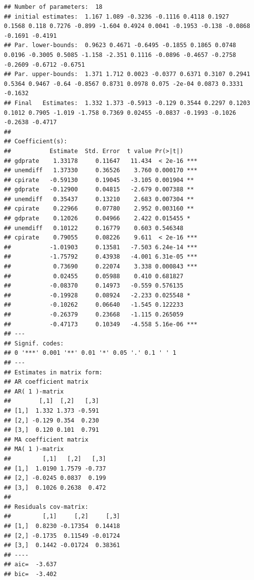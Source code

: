 \documentclass[]{book}
\newenvironment{Shaded}{\begin{snugshade}}{\end{snugshade}}
\newcommand{\DataTypeTok}[1]{\textcolor[rgb]{0.13,0.29,0.53}{#1}}
\newcommand{\DecValTok}[1]{\textcolor[rgb]{0.00,0.00,0.81}{#1}}
\newcommand{\KeywordTok}[1]{\textcolor[rgb]{0.13,0.29,0.53}{\textbf{#1}}}
\newcommand{\NormalTok}[1]{#1}
\newcommand{\OperatorTok}[1]{\textcolor[rgb]{0.81,0.36,0.00}{\textbf{#1}}}
\begin{document}
\begin{verbatim}
## Number of parameters:  18 
## initial estimates:  1.167 1.089 -0.3236 -0.1116 0.4118 0.1927 0.1568 0.118 0.7276 -0.899 -1.604 0.4924 0.0041 -0.1953 -0.138 -0.0868 -0.1691 -0.4191 
## Par. lower-bounds:  0.9623 0.4671 -0.6495 -0.1855 0.1865 0.0748 0.0196 -0.3005 0.5085 -1.158 -2.351 0.1116 -0.0896 -0.4657 -0.2758 -0.2609 -0.6712 -0.6751 
## Par. upper-bounds:  1.371 1.712 0.0023 -0.0377 0.6371 0.3107 0.2941 0.5364 0.9467 -0.64 -0.8567 0.8731 0.0978 0.075 -2e-04 0.0873 0.3331 -0.1632 
## Final   Estimates:  1.332 1.373 -0.5913 -0.129 0.3544 0.2297 0.1203 0.1012 0.7905 -1.019 -1.758 0.7369 0.02455 -0.0837 -0.1993 -0.1026 -0.2638 -0.4717 
## 
## Coefficient(s):
##           Estimate  Std. Error  t value Pr(>|t|)    
## gdprate    1.33178     0.11647   11.434  < 2e-16 ***
## unemdiff   1.37330     0.36526    3.760 0.000170 ***
## cpirate   -0.59130     0.19045   -3.105 0.001904 ** 
## gdprate   -0.12900     0.04815   -2.679 0.007388 ** 
## unemdiff   0.35437     0.13210    2.683 0.007304 ** 
## cpirate    0.22966     0.07780    2.952 0.003160 ** 
## gdprate    0.12026     0.04966    2.422 0.015455 *  
## unemdiff   0.10122     0.16779    0.603 0.546348    
## cpirate    0.79055     0.08226    9.611  < 2e-16 ***
##           -1.01903     0.13581   -7.503 6.24e-14 ***
##           -1.75792     0.43938   -4.001 6.31e-05 ***
##            0.73690     0.22074    3.338 0.000843 ***
##            0.02455     0.05988    0.410 0.681827    
##           -0.08370     0.14973   -0.559 0.576135    
##           -0.19928     0.08924   -2.233 0.025548 *  
##           -0.10262     0.06640   -1.545 0.122233    
##           -0.26379     0.23668   -1.115 0.265059    
##           -0.47173     0.10349   -4.558 5.16e-06 ***
## ---
## Signif. codes:  
## 0 '***' 0.001 '**' 0.01 '*' 0.05 '.' 0.1 ' ' 1
## --- 
## Estimates in matrix form: 
## AR coefficient matrix 
## AR( 1 )-matrix 
##        [,1]  [,2]   [,3]
## [1,]  1.332 1.373 -0.591
## [2,] -0.129 0.354  0.230
## [3,]  0.120 0.101  0.791
## MA coefficient matrix 
## MA( 1 )-matrix 
##         [,1]   [,2]   [,3]
## [1,]  1.0190 1.7579 -0.737
## [2,] -0.0245 0.0837  0.199
## [3,]  0.1026 0.2638  0.472
##   
## Residuals cov-matrix: 
##         [,1]     [,2]     [,3]
## [1,]  0.8230 -0.17354  0.14418
## [2,] -0.1735  0.11549 -0.01724
## [3,]  0.1442 -0.01724  0.38361
## ---- 
## aic=  -3.637 
## bic=  -3.402
\end{verbatim}

\begin{Shaded}
\end{Shaded}
\end{document}
